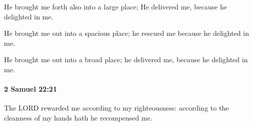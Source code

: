 			\begin{versebox}
					\item[BHS] 
					\item[ASV] He brought me forth also into a large place; He delivered me, because he delighted in me.
					\item[NIV] He brought me out into a spacious place; he rescued me because he delighted in me.
					\item[NRSV] He brought me out into a broad place; he delivered me, because he delighted in me.
			\end{versebox}

		\paragraph{2 Samuel 22:21} %
			\label{2SAMUEL-22-21}

			The LORD rewarded me according to my righteousness: according to the cleanness of my hands hath he recompensed me.


